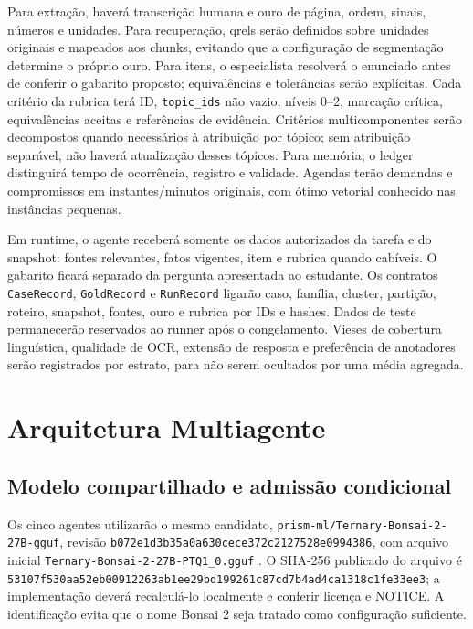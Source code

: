 \documentclass[12pt]{article}
\let\cite\citep
\newcommand{\code}[1]{\nolinkurl{#1}}
\begin{document}
Para extração, haverá transcrição humana e ouro de página, ordem, sinais, números e unidades. Para recuperação, qrels serão definidos sobre unidades originais e mapeados aos chunks, evitando que a configuração de segmentação determine o próprio ouro. Para itens, o especialista resolverá o enunciado antes de conferir o gabarito proposto; equivalências e tolerâncias serão explícitas. Cada critério da rubrica terá ID, \code{topic_ids} não vazio, níveis 0--2, marcação crítica, equivalências aceitas e referências de evidência. Critérios multicomponentes serão decompostos quando necessários à atribuição por tópico; sem atribuição separável, não haverá atualização desses tópicos. Para memória, o ledger distinguirá tempo de ocorrência, registro e validade. Agendas terão demandas e compromissos em instantes/minutos originais, com ótimo vetorial conhecido nas instâncias pequenas.

Em runtime, o agente receberá somente os dados autorizados da tarefa e do snapshot: fontes relevantes, fatos vigentes, item e rubrica quando cabíveis. O gabarito ficará separado da pergunta apresentada ao estudante. Os contratos \code{CaseRecord}, \code{GoldRecord} e \code{RunRecord} ligarão caso, família, cluster, partição, roteiro, snapshot, fontes, ouro e rubrica por IDs e hashes. Dados de teste permanecerão reservados ao runner após o congelamento. Vieses de cobertura linguística, qualidade de OCR, extensão de resposta e preferência de anotadores serão registrados por estrato, para não serem ocultados por uma média agregada.

\section{Arquitetura Multiagente}
\label{sec:arquitetura}

\subsection{Modelo compartilhado e admissão condicional}

Os cinco agentes utilizarão o mesmo candidato, \code{prism-ml/Ternary-Bonsai-2-27B-gguf}, revisão \nolinkurl{b072e1d3b35a0a630cece372c2127528e0994386}, com arquivo inicial \code{Ternary-Bonsai-2-27B-PTQ1_0.gguf} \cite{bonsai2}. O SHA-256 publicado do arquivo é \nolinkurl{53107f530aa52eb00912263ab1ee29bd199261c87cd7b4ad4ca1318c1fe33ee3}; a implementação deverá recalculá-lo localmente e conferir licença e NOTICE. A identificação evita que o nome Bonsai 2 seja tratado como configuração suficiente.
\end{document}
